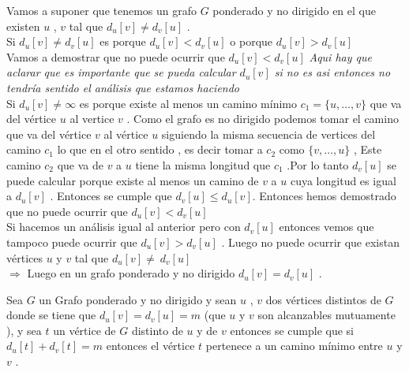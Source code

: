 \documentclass[10pt]{article}
\begin{document}
    \noindent Vamos a suponer que tenemos un grafo $G$ ponderado y no dirigido en el que existen $u$ , $v$ tal que  $d_u\left[v\right] \neq d_v\left[u\right] $ .
    \\[10pt]
    Si  $d_u\left[v\right] \neq d_v\left[u\right] $  es porque $d_u\left[v\right] < d_v\left[u\right] $  o porque $d_u\left[v\right] > d_v\left[u\right] $ 
    \\[10pt]
    Vamos a demostrar que no puede ocurrir que $d_u\left[v\right] < d_v\left[u\right] $ \textit{Aqui hay que aclarar que es importante que se pueda calcular $d_u\left[v\right]$ si no es asi entonces no tendr\'ia sentido el an\'alisis que estamos haciendo }
    \\[10pt]
    Si $d_u\left[v\right] \neq \infty$ es porque existe al menos un camino m\'inimo $c_1 = \{u ,\dots, v\}$ que va del v\'ertice $u$ al vertice $v$ . 
    Como el grafo es no dirigido podemos tomar el camino que va del v\'ertice $v$ al v\'ertice $u$ siguiendo la misma secuencia de vertices del camino $c_1$ lo que en el otro sentido ,  es decir 
    tomar a $c_2$ como $\{v,\dots , u\}$ , Este camino $c_2$ que va de $v$ a $u$ tiene la misma longitud que $c_1$ .Por lo tanto $d_{v}\left[u\right]$ se puede calcular porque existe al menos un camino de $v$ a $u$  cuya longitud es igual a  $d_{u}\left[v\right]$ . Entonces se cumple que  $d_v\left[u\right] \leq d_u\left[v\right]$. 
    Entonces hemos demostrado que  no puede ocurrir que $d_u\left[v\right] < d_v\left[u\right] $
    \\[10pt]
    Si hacemos un an\'alisis igual al anterior pero con $d_{v}\left[u\right]$ entonces vemos que tampoco puede ocurrir que $d_u\left[v\right] > d_v\left[u\right] $ .  Luego no puede ocurrir que existan v\'ertices $u$ y $v$ tal que $d_u\left[v\right] \neq~d_{v}\left[u\right] $ 
    \\[5pt]
    $\Rightarrow$ Luego en un grafo ponderado y no dirigido  $d_u\left[v\right] = d_v\left[u\right] $ .

    \begin{thm}
        Sea $G$ un Grafo ponderado y no dirigido y sean $u$ , $v$ dos v\'ertices distintos de $G$ donde se tiene  que $d_u\left[v\right] = d_v\left[u\right] = m $  (que $u$ y $v$ son alcanzables mutuamente ), y sea $t$ un v\'ertice de $G$ distinto de $u$ y de $v$ entonces se cumple que si
        $d_u\left[t\right] + d_v\left[t\right] = m $ entonces el v\'ertice $t$ pertenece a un camino m\'inimo entre $u$ y $v$ . 
    \end{thm}
\end{document}
